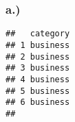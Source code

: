 \documentclass[
]{article}
\newenvironment{Shaded}{\begin{snugshade}}{\end{snugshade}}
\newcommand{\FunctionTok}[1]{\textcolor[rgb]{0.00,0.00,0.00}{#1}}
\newcommand{\NormalTok}[1]{#1}
\newcommand{\OtherTok}[1]{\textcolor[rgb]{0.56,0.35,0.01}{#1}}
\newcommand{\SpecialCharTok}[1]{\textcolor[rgb]{0.00,0.00,0.00}{#1}}
\begin{document}
\hypertarget{a.-3}{%
\subsubsection{a.)}\label{a.-3}}

\begin{Shaded}
\end{Shaded}

\begin{verbatim}
##   category
## 1 business
## 2 business
## 3 business
## 4 business
## 5 business
## 6 business
##                                                                                                                                                                                                                                                                                                                                                                                                                                                                                                                                                                                                                                                                                                                                                                                                                                                                                                                                                                                                                                                                                                                                                                                                                                                                                                                                                                                                                                                                                                                                                                                                                                                                                                                                                                                                                                                                                                                                                                                                                                                                                                                                                                                                                                                                                                                                                                                                                                                                                                                                                     
\end{verbatim}
\end{document}
